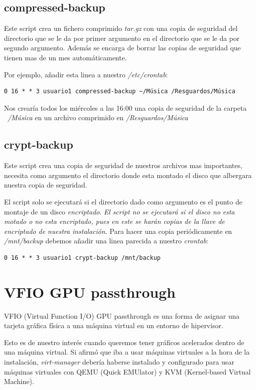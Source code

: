 \documentclass[12pt]{article}
\begin{document}
\subsection{compressed-backup}

Este script crea un fichero comprimido \emph{tar.gz} con una copia de seguridad del directorio que se le da por primer argumento en el directorio que se le da por segundo argumento. Además se encarga de borrar las copias de seguridad que tienen mas de un mes automáticamente.

Por ejemplo, añadir esta linea a nuestro \emph{/etc/crontab}:

\begin{verbatim}
0 16 * * 3 usuario1 compressed-backup ~/Música /Resguardos/Música
\end{verbatim}

Nos crearía todos los miércoles a las 16:00 una copia de seguridad de la carpeta \emph{~/Música} en un archivo comprimido en \emph{/Resguardos/Música}

\subsection{crypt-backup}

Este script crea una copia de seguridad de nuestros archivos mas importantes, necesita como argumento el directorio donde esta montado el disco que albergara nuestra copia de seguridad.

El script solo se ejecutará si el directorio dado como argumento es el punto de montaje de un disco \emph{encriptado}. \emph{El script no se ejecutará si el disco no esta motado o no esta encriptado, pues en este se harán copias de la llave de encriptado de nuestra instalación.} Para hacer una copia periódicamente en \emph{/mnt/backup} debemos añadir una linea parecida a nuestro \emph{crontab}:

\begin{verbatim}
0 16 * * 3 usuario1 crypt-backup /mnt/backup
\end{verbatim}

\section{VFIO GPU passthrough}

VFIO (Virtual Function I/O) GPU passthrough es una forma de asignar una tarjeta gráfica física a una máquina virtual en un entorno de hipervisor.

Esto es de nuestro interés cuando queremos tener gráficos acelerados dentro de una máquina virtual. Si afirmó que iba a usar máquinas virtuales a la hora de la instalación, \emph{virt-manager} debería haberse instalado y configurado para usar máquinas virtuales con QEMU (Quick EMUlator) y KVM (Kernel-based Virtual Machine).
\end{document}
